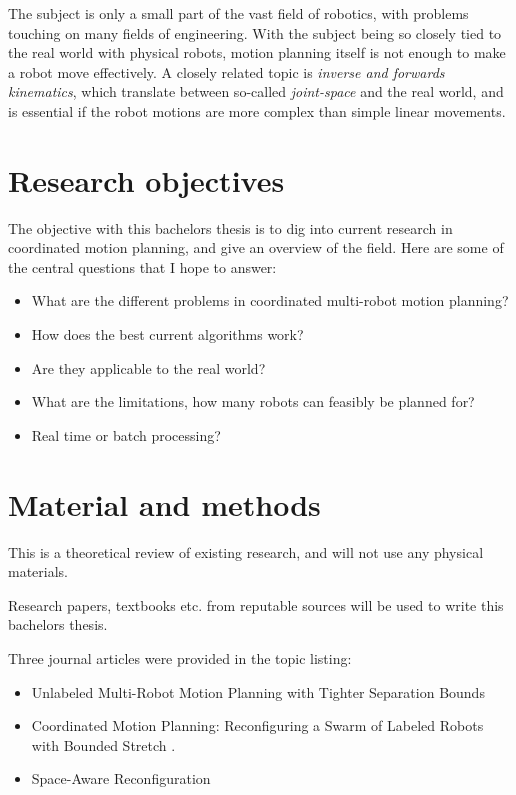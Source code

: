 \documentclass[12pt,a4paper,english,oneside]{article}
\begin{document}
The subject is only a small part of the vast field of robotics, with problems touching on many fields of engineering. 
With the subject being so closely tied to the real world with physical robots, motion planning itself is not enough to make a robot move effectively. 
A closely related topic is \emph{inverse and forwards kinematics}, which translate between so-called \emph{joint-space} and the real world, and is essential if the robot motions are more complex than simple linear movements. 

\section{Research objectives}

The objective with this bachelors thesis is to dig into current research in coordinated motion planning, and give an overview of the field. Here are some of the central questions that I hope to answer: 

\begin{itemize}
	\item What are the different problems in coordinated multi-robot motion planning?
	\item How does the best current algorithms work?
	\item Are they applicable to the real world?
	\item What are the limitations, how many robots can feasibly be planned for?
	\item Real time or batch processing? 
\end{itemize}


\section{Material and methods}

This is a theoretical review of existing research, and will not use any physical materials. 

Research papers, textbooks etc. from reputable sources will be used to write this bachelors thesis.

Three journal articles were provided in the topic listing:

\begin{itemize}
	\item Unlabeled Multi-Robot Motion Planning with Tighter Separation Bounds \cite{banyassadyUnlabeledMultiRobotMotion2022}
	\item Coordinated Motion Planning: Reconfiguring a Swarm of Labeled Robots with Bounded Stretch \cite{banyassadyUnlabeledMultiRobotMotion2022}.
	\item Space-Aware Reconfiguration \cite{halperinSpaceAwareReconfiguration2022}
\end{itemize}
\end{document}
